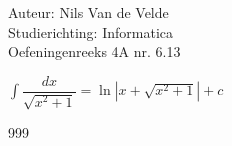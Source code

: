 \documentclass[a4paper]{article}
\begin{document}
  
\noindent \large Auteur: Nils Van de Velde \\
\noindent \large Studierichting: Informatica\\
\noindent \large Oefeningenreeks 4A nr. 6.13\\

\medskip

\normalsize

$\displaystyle\int\dfrac{dx}{\sqrt{x^2+1}}=\ln|x+\sqrt{x^2+1}|+c$\\

\begin{thebibliography}{999}
\end{thebibliography}
\end{document}
